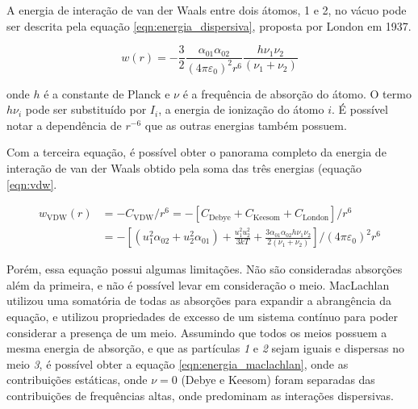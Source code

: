 	A energia de interação de van der Waals entre dois átomos, 1 e 2,  no vácuo pode ser descrita pela equação \ref{eqn:energia_dispersiva}, proposta por London em 1937.
	
	\begin{equation}
		w(r) = - \frac { 3 } { 2 } \frac { \alpha _ { 01 } \alpha _ { 02 } } { \left( 4 \pi \varepsilon _ { 0 } \right) ^ { 2 } r ^ { 6 } } \frac { h \nu _ { 1 } \nu _ { 2 } } { \left( \nu _ { 1 } + \nu _ { 2 } \right) }
		\label{eqn:energia_dispersiva}
	\end{equation} 
	
	\noindent onde \(h\) é a constante de Planck e \(\nu\) é a frequência de absorção do átomo. O termo \(h\nu_i\) pode ser substituído por \(I_i\), a energia de ionização do átomo \(i\). É possível notar a dependência de \(r^{-6}\) que as outras energias também possuem. 
	
	
	Com a terceira equação, é possível obter o panorama completo da energia de interação de van der Waals obtido pela soma das três energias (equação \ref{eqn:vdw}.
	
	\begin{subequations}
	\begin{align}
		w_{\mathrm{VDW}}(r) &= -C_{\mathrm{VDW}}/r^{6} = -\left[C_{\mathrm{Debye}}+C_{\mathrm{Keesom}}+C_{\mathrm{London}}\right]/r^{6} \label{eqn:vdw_geral} \\
							&= - \left[ \left( u_{1}^{2}\alpha_{02} + u_{2}^{2}\alpha_{01} \right)   + \frac{u_{1}^{2}u_{2}^{2}}{3kT} + \frac{3\alpha_{01}\alpha_{02}h\nu_{1}\nu_{2}}{2\left(\nu_{1} + \nu_{2}\right)}\right]/\left(4\pi\varepsilon_{0}\right)^{2}r^{6} \label{eqn:vdw_completa}
	\end{align}
	\label{eqn:vdw}
	\end{subequations} 
	
	Porém, essa equação possui algumas limitações. Não são consideradas absorções além da primeira, e não é possível levar em consideração o meio. MacLachlan utilizou uma somatória de todas as absorções para expandir a abrangência da equação, e utilizou propriedades de excesso de um sistema contínuo para poder considerar a presença de um meio. Assumindo que todos os meios possuem a mesma energia de absorção, e que as partículas \emph{1} e \emph{2} sejam iguais e dispersas no meio \emph{3}, é possível obter a equação \ref{eqn:energia_maclachlan}, onde as contribuições estáticas, onde \(\nu = 0\) (Debye e Keesom) foram separadas das contribuições de frequências altas, onde predominam as interações dispersivas.
	
